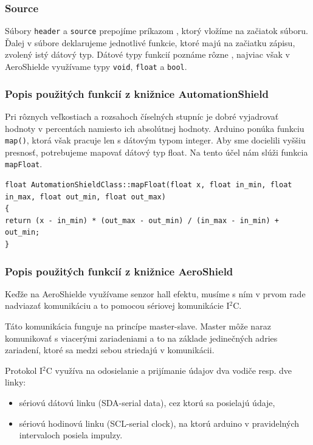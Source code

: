 \subsubsection{Source}

Súbory \verb|header| a \verb|source| prepojíme príkazom , ktorý vložíme na začiatok súboru. Ďalej v súbore deklarujeme jednotlivé funkcie, ktoré majú na začiatku zápisu, zvolený istý dátový typ. Dátové typy funkcií poznáme rôzne \cite{datovetypy}, najviac však v AeroShielde využívame typy \verb|void|, \verb|float| a \verb|bool|. 


\subsubsection{Popis použitých funkcií z knižnice AutomationShield}

Pri rôznych veľkostiach a rozsahoch číselných stupníc je dobré vyjadrovať hodnoty v percentách namiesto ich absolútnej hodnoty. Arduino ponúka funkciu \verb|map()|, ktorá však pracuje len s dátovým typom integer. Aby sme docielili vyššiu presnosť, potrebujeme mapovať dátový typ float. Na tento účel nám slúži funkcia \verb|mapFloat|. 

\begin{lstlisting}[caption={Zdrojový kód funkcie mapFloat.},captionpos=b]
float AutomationShieldClass::mapFloat(float x, float in_min, float in_max, float out_min, float out_max) 
{
return (x - in_min) * (out_max - out_min) / (in_max - in_min) + out_min; 
}
\end{lstlisting}


\subsubsection{Popis použitých funkcií z knižnice AeroShield}
\label{kodikSource}


Keďže na AeroShielde využívame senzor hall efektu, musíme s ním v prvom rade nadviazať komunikáciu a to pomocou sériovej komunikácie I$^{2}$C.

Táto komunikácia funguje na princípe master-slave. Master môže naraz komunikovať s viacerými zariadeniami a to na základe jedinečných adries zariadení, ktoré sa medzi sebou striedajú v komunikácii.

 Protokol I$^{2}$C využíva na odosielanie a prijímanie údajov dva vodiče resp. dve linky: 
\begin{itemize}
\item sériovú dátovú linku (SDA-serial data), cez ktorú sa posielajú údaje, 
\item sériovú hodinovú linku (SCL-serial clock), na ktorú arduino v pravidelných intervaloch posiela impulzy. 
\end{itemize}

